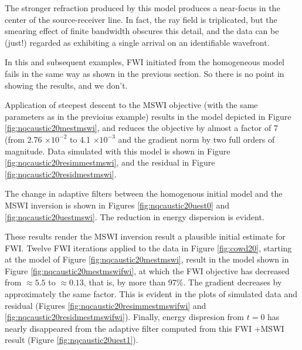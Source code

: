 
The stronger refraction produced by this model produces a near-focus in
the center of the source-receiver line. In fact, the ray field is
triplicated, but the smearing effect of finite bandwidth obscures this
detail, and the data can be (just!) regarded as exhibiting a single
arrival on an identifiable wavefront.

In this and subsequent examples, FWI initiated from the homogeneous
model fails in the same way as shown in the  previous section. So
there is no point in showing the results, and we don't.

Application of steepest descent to the MSWI objective (with the same
parameters as in the previoius example) results in the model depicted
in Figure \ref{fig:nqcaustic20mestmswi}, and reduces the objective by
almost a factor of 7 (from 2.76 $\times 10^{-2}$ to 4.1 $\times
10^{-3}$ and the gradient norm by two full orders of magnitude. Data
simulated with this model is shown in Figure
\ref{fig:nqcaustic20resimmestmswi}, and the residual in Figure
\ref{fig:nqcaustic20residmestmswi}.




The change in adaptive filters between the homogenous initial model
and the MSWI inversion is shown in Figures
\ref{fig:nqcaustic20uest0} and \ref{fig:nqcaustic20uestmswi}. The
reduction in energy dispersion is evident.


These results render the MSWI inversion result a plausible initial
estimate for FWI. Twelve FWI iterations applied to the data in Figure \ref{fig:cowd20}, starting at the model of
Figure \ref{fig:nqcaustic20mestmswi}, result in the
model shown in Figure \ref{fig:nqcaustic20mestmswifwi}, at which the
FWI objective has decreased from $\approx 5.5$ to $\approx 0.13$, that
is, by more than 97\%. The gradient decreases by approximately the
same factor. This is evident in the plots of simulated data and
residual (Figures \ref{fig:nqcaustic20resimmestmswifwi} and
\ref{fig:nqcaustic20residmestmswifwi}). Finally, energy dispresion
from $t=0$ has nearly disappeared from the adaptive filter computed
from this FWI +MSWI result (Figure \ref{fig:nqcaustic20uest1}).

